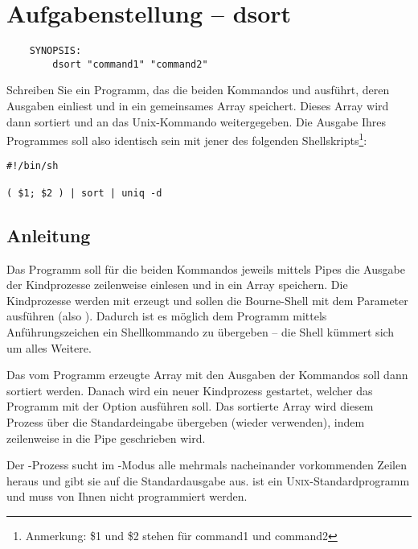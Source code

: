




\section*{Aufgabenstellung -- dsort}

\begin{verbatim}
    SYNOPSIS:
        dsort "command1" "command2"
\end{verbatim}

Schreiben Sie ein Programm, das die beiden Kommandos 
und  ausführt, deren Ausgaben einliest und in ein
gemeinsames Array speichert. Dieses Array wird dann sortiert und an
das Unix-Kommando  weitergegeben. Die Ausgabe Ihres
Programmes soll also identisch sein mit jener des folgenden
Shellskripts\footnote{Anmerkung: \$1 und \$2 stehen für command1 und
command2}:

\begin{verbatim}
#!/bin/sh

( $1; $2 ) | sort | uniq -d
\end{verbatim}

\subsection*{Anleitung}

Das Programm soll für die beiden Kommandos jeweils mittels Pipes die
Ausgabe der Kindprozesse zeilenweise einlesen und in ein Array
speichern. Die Kindprozesse werden mit  erzeugt und
sollen die Bourne-Shell mit dem Parameter  ausführen (also
). Dadurch ist es möglich dem Programm mittels
Anführungszeichen ein Shellkommando zu übergeben -- die Shell kümmert
sich um alles Weitere.

Das vom Programm erzeugte Array mit den Ausgaben der Kommandos soll
dann sortiert werden. Danach wird ein neuer Kindprozess gestartet,
welcher das Programm  mit der Option  ausführen
soll. Das sortierte Array wird diesem Prozess über die Standardeingabe
übergeben (wieder  verwenden), indem zeilenweise in die
Pipe geschrieben wird.

Der -Prozess sucht im -Modus alle mehrmals
nacheinander vorkommenden Zeilen heraus und gibt sie auf die
Standardausgabe aus.  ist ein
\textsc{Unix}-Standardprogramm und muss von Ihnen nicht programmiert
werden.

